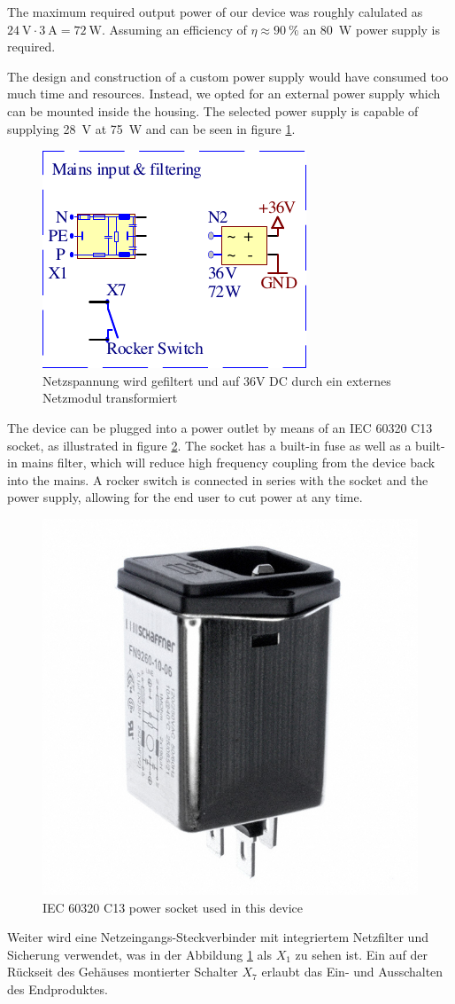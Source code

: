 The maximum required  output  power  of  our  device  was  roughly  calulated as
$\SI{24}{\volt} \cdot \SI{3}{\ampere} = \SI{72}{\watt}$.  Assuming an efficiency
of $\eta\approx \SI{90}{\percent}$ an \SI{80}{W} power supply is required.

The design and construction of a  custom  power  supply  would have consumed too
much  time and resources. Instead, we opted for an external power  supply  which
can be mounted inside the  housing.  The  selected  power  supply  is capable of
supplying  \SI{28}{\volt}  at   \SI{75}{\watt}   and   can  be  seen  in  figure
\ref{fig:circuit:mains-input}.

\begin{figure}[th!]
    \center
    \includegraphics[width=.35\textwidth]{images/circuit/mains-input.pdf}
    \caption{Netzspannung wird gefiltert und auf 36V DC durch ein externes Netzmodul transformiert}
    \label{fig:circuit:mains-input}
\end{figure}

The  device  can be plugged into a power outlet by means of  an  IEC  60320  C13
socket, as illustrated in figure \ref{fig:circuit:iec60320c13}. The socket has a
built-in  fuse  as  well  as  a  built-in  mains  filter, which will reduce high
frequency coupling from the device back into the mains. A rocker switch  is  connected in series with
the socket and the power supply,  allowing  for the end user to cut power at any
time.

\begin{figure}
    \center
    \includegraphics[width=.2\textwidth]{images/circuit/power-entry-module.JPG}
    \caption{IEC 60320 C13 power socket used in this device}
    \label{fig:circuit:iec60320c13}
\end{figure}

Weiter  wird  eine  Netzeingangs-Steckverbinder  mit integriertem Netzfilter und
Sicherung  verwendet,  was  in der Abbildung  \ref{fig:circuit:mains-input}  als
$X_1$  zu  sehen  ist. Ein auf der R\"uckseit des Geh\"auses montierter Schalter
$X_7$ erlaubt das Ein- und Ausschalten des Endproduktes.

